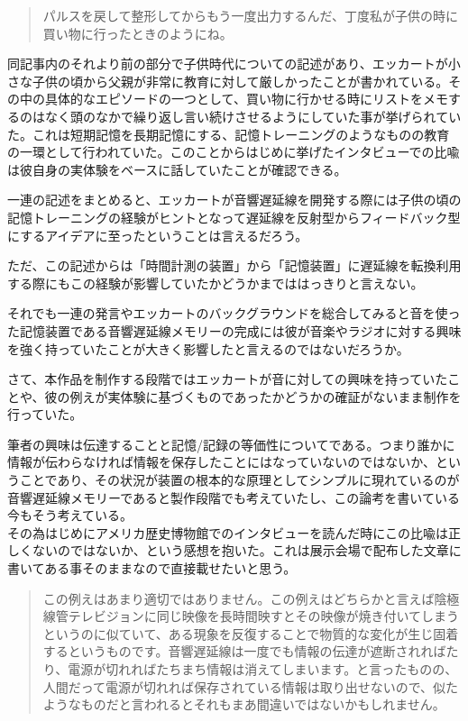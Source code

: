 \documentclass[a4paper,report]{jsbook}
\begin{document}
\begin{quote}
パルスを戻して整形してからもう一度出力するんだ、丁度私が子供の時に買い物に行ったときのようにね。
\end{quote}

同記事内のそれより前の部分で子供時代についての記述があり、エッカートが小さな子供の頃から父親が非常に教育に対して厳しかったことが書かれている。その中の具体的なエピソードの一つとして、買い物に行かせる時にリストをメモするのはなく頭のなかで繰り返し言い続けさせるようにしていた事が挙げられていた。これは短期記憶を長期記憶にする、記憶トレーニングのようなものの教育の一環として行われていた。このことからはじめに挙げたインタビューでの比喩は彼自身の実体験をベースに話していたことが確認できる。

一連の記述をまとめると、エッカートが音響遅延線を開発する際には子供の頃の記憶トレーニングの経験がヒントとなって遅延線を反射型からフィードバック型にするアイデアに至ったということは言えるだろう。

ただ、この記述からは「時間計測の装置」から「記憶装置」に遅延線を転換利用する際にもこの経験が影響していたかどうかまでははっきりと言えない。

それでも一連の発言やエッカートのバックグラウンドを総合してみると音を使った記憶装置である音響遅延線メモリーの完成には彼が音楽やラジオに対する興味を強く持っていたことが大きく影響したと言えるのではないだろうか。

さて、本作品を制作する段階ではエッカートが音に対しての興味を持っていたことや、彼の例えが実体験に基づくものであったかどうかの確証がないまま制作を行っていた。

筆者の興味は伝達することと記憶/記録の等価性についてである。つまり誰かに情報が伝わらなければ情報を保存したことにはなっていないのではないか、ということであり、その状況が装置の根本的な原理としてシンプルに現れているのが音響遅延線メモリーであると製作段階でも考えていたし、この論考を書いている今もそう考えている。\\
その為はじめにアメリカ歴史博物館でのインタビューを読んだ時にこの比喩は正しくないのではないか、という感想を抱いた。これは展示会場で配布した文章に書いてある事そのままなので直接載せたいと思う。

\begin{quote}
この例えはあまり適切ではありません。この例えはどちらかと言えば陰極線管テレビジョンに同じ映像を長時間映すとその映像が焼き付いてしまうというのに似ていて、ある現象を反復することで物質的な変化が生じ固着するというものです。音響遅延線は一度でも情報の伝達が遮断されればたり、電源が切れればたちまち情報は消えてしまいます。と言ったものの、人間だって電源が切れれば保存されている情報は取り出せないので、似たようなものだと言われるとそれもまあ間違いではないかもしれません。
\end{quote}
\end{document}
